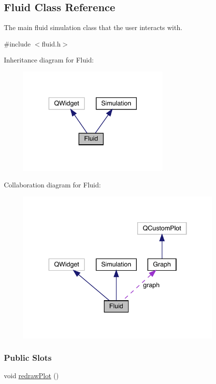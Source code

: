 \hypertarget{classFluid}{}\subsection{Fluid Class Reference}
\label{classFluid}


The main fluid simulation class that the user interacts with.  




{\ttfamily \#include $<$fluid.\+h$>$}



Inheritance diagram for Fluid\+:\nopagebreak
\begin{figure}[H]
\begin{center}
\leavevmode
\includegraphics[width=216pt]{classFluid__inherit__graph}
\end{center}
\end{figure}


Collaboration diagram for Fluid\+:\nopagebreak
\begin{figure}[H]
\begin{center}
\leavevmode
\includegraphics[width=293pt]{classFluid__coll__graph}
\end{center}
\end{figure}
\subsubsection*{Public Slots}
\begin{DoxyCompactItemize}
\item 
void \mbox{\hyperlink{classFluid_a020c8985824d3d7be033cb2916d77c24}{redraw\+Plot}} ()
\end{DoxyCompactItemize}
